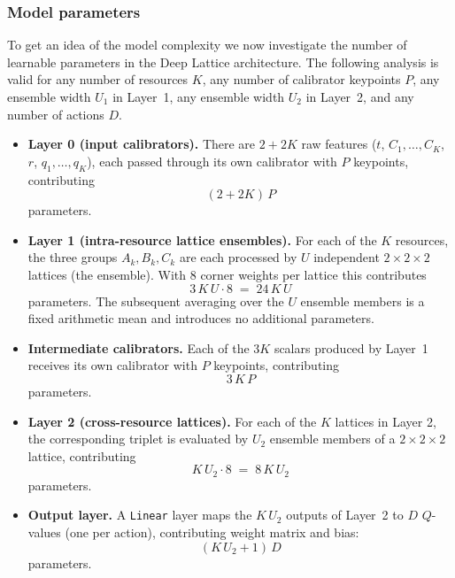 \subsubsection{Model parameters}
\label{subsec:lattice-params}
To get an idea of the model complexity we now investigate the number of learnable parameters in the Deep Lattice architecture. The following analysis is valid for any number of resources $K$, any number of calibrator keypoints $P$, any ensemble width $U_1$ in Layer~1, any ensemble width $U_2$ in Layer~2, and any number of actions $D$.

\begin{itemize}
  \item \textbf{Layer 0 (input calibrators).} There are $2+2K$ raw features
        ($t$, $C_1,\dots,C_K$, $r$, $q_1,\dots,q_K$), each passed through its own calibrator
        with $P$ keypoints, contributing
        \[
          (2+2K)\,P
        \]
        parameters.

  \item \textbf{Layer 1 (intra-resource lattice ensembles).} For each of the $K$ resources, the
        three groups $A_k, B_k, C_k$ are each processed by $U$ independent
        $2\times2\times2$ lattices (the ensemble). With $8$ corner weights per lattice this
        contributes
        \[
          3\,K\,U \cdot 8 \;=\; 24\,K\,U
        \]
        parameters. The subsequent averaging over the $U$ ensemble members is a fixed
        arithmetic mean and introduces no additional parameters.

  \item \textbf{Intermediate calibrators.} Each of the $3K$ scalars produced by
        Layer~1 receives its own calibrator with $P$ keypoints, contributing
        \[
          3\,K\,P
        \]
        parameters.

  \item \textbf{Layer 2 (cross-resource lattices).} For each of the $K$ lattices in Layer 2, the
        corresponding triplet is evaluated by $U_2$ ensemble members of a $2\times2\times2$ lattice, contributing
        \[
          K\,U_2 \cdot 8 \;=\; 8\,K\,U_2
        \]
        parameters.

  \item \textbf{Output layer.} A \texttt{Linear} layer maps the $K\,U_2$ outputs of Layer~2 to
        $D$ $Q$-values (one per action), contributing weight matrix and bias:
        \[
          (K\,U_2 + 1)\,D
        \]
        parameters.
\end{itemize}

